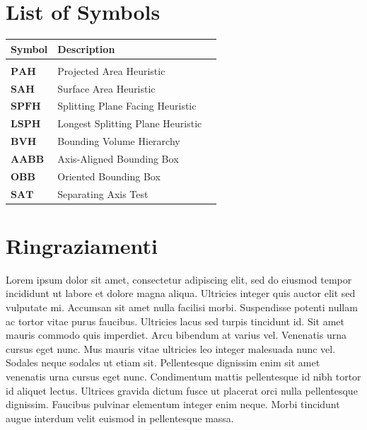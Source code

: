 \documentclass{PoliMi_MasterThesis}
\begin{document}
\listoffigures
\listoftables



\chapter*{List of Symbols} %
\begin{table}[H]
    \centering
    \begin{tabular}{lll}
        \textbf{Symbol} & \textbf{Description}\\\hline\\[-9px]
        $\bm{PAH}$ & Projected Area Heuristic\\[2px]
        $\bm{SAH}$ & Surface Area Heuristic\\[2px]
        $\bm{SPFH}$ & Splitting Plane Facing Heuristic\\[2px]
        $\bm{LSPH}$ & Longest Splitting Plane Heuristic\\[2px]
        $\bm{BVH}$ & Bounding Volume Hierarchy\\[2px]
        $\bm{AABB}$ & Axis-Aligned Bounding Box\\[2px]
        $\bm{OBB}$ & Oriented Bounding Box\\[2px]
        $\bm{SAT}$ & Separating Axis Test\\[2px]
    \end{tabular}
\end{table}

\chapter*{Ringraziamenti}
\small
Lorem ipsum dolor sit amet, consectetur adipiscing elit, sed do eiusmod tempor incididunt ut labore et dolore magna aliqua. Ultricies integer quis auctor elit sed vulputate mi. Accumsan sit amet nulla facilisi morbi. Suspendisse potenti nullam ac tortor vitae purus faucibus. Ultricies lacus sed turpis tincidunt id. Sit amet mauris commodo quis imperdiet. Arcu bibendum at varius vel. Venenatis urna cursus eget nunc. Mus mauris vitae ultricies leo integer malesuada nunc vel. Sodales neque sodales ut etiam sit. Pellentesque dignissim enim sit amet venenatis urna cursus eget nunc. Condimentum mattis pellentesque id nibh tortor id aliquet lectus. Ultrices gravida dictum fusce ut placerat orci nulla pellentesque dignissim. Faucibus pulvinar elementum integer enim neque. Morbi tincidunt augue interdum velit euismod in pellentesque massa.
\end{document}
